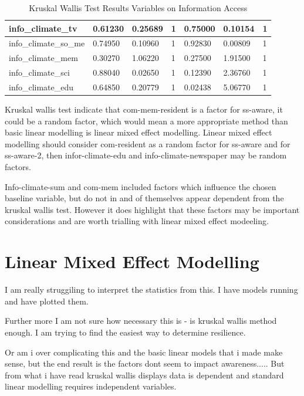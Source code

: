 \begin{table}[h]
\begin{tabular}{|l|l|l|l|l|l|l|}
        info\_climate\_tv & 0.61230 & 0.25689 & 1 & 0.75000 & 0.10154 & 1 \\ \hline
        info\_climate\_so\_me & 0.74950 & 0.10960 & 1 & 0.92830 & 0.00809 & 1 \\ \hline
        info\_climate\_mem & 0.30270 & 1.06220 & 1 & 0.27500 & 1.91500 & 1 \\ \hline
        info\_climate\_sci & 0.88040 & 0.02650 & 1 & 0.12390 & 2.36760 & 1 \\ \hline
        info\_climate\_edu & 0.64850 & 0.20779 & 1 & 0.02438 & 5.06770 & 1 \\ \hline
    \end{tabular}
    \caption{Kruskal Wallis Test Results Variables on Information Access}
    \label{Kruskal_wallis_test_information}
\end{table}

Kruskal wallis test indicate that com-mem-resident is a factor for ss-aware, it could be a random factor, which would mean a more appropriate method than basic linear modelling is linear mixed effect modelling. Linear mixed effect modelling should consider com-resident as a random factor for ss-aware and for ss-aware-2, then infor-climate-edu and info-climate-newspaper may be random factors.

Info-climate-sum and com-mem included factors which influence the chosen baseline variable, but do not in and of themselves appear dependent from the kruskal wallis test. However it does highlight that these factors may be important considerations and are worth trialling with linear mixed effect modeeling.

\section{Linear Mixed Effect Modelling}
I am really struggiling to interpret the statistics from this. 
I have models running and have plotted them. 

Further more I am not sure how necessary this is - is kruskal wallis method enough. I am trying to find the easiest way to determine resilience.

Or am i over complicating this and the basic linear models that i made make sense, but the end result is the factors dont seem to impact awareness.....
But from what i have read kruskal wallis displays data is dependent and standard linear modelling requires independent variables. 

